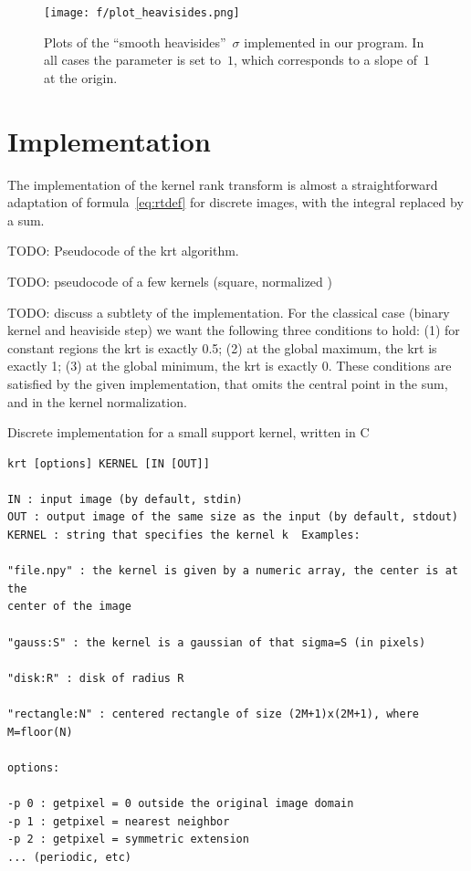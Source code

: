\documentclass[12pt]{article}                  %
\begin{document}

\begin{figure}
	\centering
	\texttt{[image: f/plot\_heavisides.png]}
	\caption{Plots of the ``smooth heavisides''~$\sigma$ implemented in
	our program.  In all cases the parameter is set to~$1$, which
	corresponds to a slope of~$1$ at the origin.}
	\label{fig:heavisides}
\end{figure}



\section{Implementation}

The implementation of the kernel rank transform is almost a straightforward
adaptation of formula~\ref{eq:rtdef} for discrete images, with the integral
replaced by a sum.

TODO: Pseudocode of the krt algorithm.

TODO: pseudocode of a few kernels (square, normalized )

TODO: discuss a subtlety of the implementation.  For the classical case
(binary kernel and heaviside step) we want the following three conditions to
hold: (1) for constant regions the krt is exactly 0.5;  (2) at the global
maximum, the krt is exactly 1; (3) at the global minimum, the krt is exactly
0.  These conditions are satisfied by the given implementation, that omits
the central point in the sum, and in the kernel normalization.

Discrete implementation for a small support kernel, written in C

{\small
\begin{verbatim}
krt [options] KERNEL [IN [OUT]]

IN : input image (by default, stdin)
OUT : output image of the same size as the input (by default, stdout)
KERNEL : string that specifies the kernel k  Examples:

"file.npy" : the kernel is given by a numeric array, the center is at the
center of the image

"gauss:S" : the kernel is a gaussian of that sigma=S (in pixels)

"disk:R" : disk of radius R

"rectangle:N" : centered rectangle of size (2M+1)x(2M+1), where M=floor(N)

options:

-p 0 : getpixel = 0 outside the original image domain
-p 1 : getpixel = nearest neighbor
-p 2 : getpixel = symmetric extension
... (periodic, etc)

\end{verbatim}
}
\end{document}
